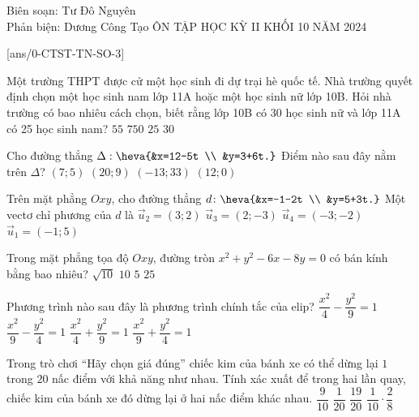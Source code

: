 
\setcounter{demsode}{3} %

\begin{name}
	{Biên soạn: Tư Đô Nguyên\\
		Phản biện: Dương Công Tạo}
	{ÔN TẬP HỌC KỲ II KHỐI 10 NĂM 2024}
\end{name}

\cautn
{}[ans/0-CTST-TN-SO-3]
\setcounter{ex}{0}

\begin{ex}%
	Một trường THPT được cử một học sinh đi dự trại hè quốc tế. Nhà trường quyết định chọn một học sinh nam lớp 11A hoặc một học sinh nữ lớp 10B. Hỏi nhà trường có bao nhiêu cách chọn, biết rằng lớp 10B có 30 học sinh nữ và lớp 11A có 25 học sinh nam?
	\choice
	{\True $55$}
	{$750$}
	{$25$}
	{$30$}
	\loigiai{}
\end{ex}
\begin{ex}%
	Cho đường thẳng $\Delta:\heva{&x=12-5t \\
		&y=3+6t.}$ Điểm nào sau đây nằm trên $\Delta$?
	\choice
	{$(7; 5)$}
	{$(20; 9)$}
	{\True $(-13; 33)$}
	{$(12; 0)$}
	\loigiai{}
\end{ex}
\begin{ex}%
	Trên mặt phẳng $Ox y$, cho đường thẳng $d\colon \heva{&x=-1-2t \\
		&y=5+3t.}$ Một vectơ chỉ phương của $d$ là
	\choice
	{$\vec{u}_2=(3; 2)$}
	{\True$\vec{u}_3=(2;-3)$}
	{$\vec{u}_4=(-3;-2)$}
	{$\vec{u}_1=(-1; 5)$}
	\loigiai{}
\end{ex}
\begin{ex}%
	Trong mặt phẳng tọa độ $Ox y$, đường tròn $x^2+y^2-6x-8y=0$ có bán kính bằng bao nhiêu?
	\choice
	{$\sqrt{10}$}
	{$10$}
	{\True$5$}
	{$25$}
	\loigiai{}
\end{ex}
\begin{ex}%
	Phương trình nào sau đây là phương trình chính tắc của elip?
	\choice
	{$\dfrac{x^2}{4}-\dfrac{y^2}{9}=1$}
	{$\dfrac{x^2}{9}-\dfrac{y^2}{4}=1$}
	{$\dfrac{x^2}{4}+\dfrac{y^2}{9}=1$}
	{\True$\dfrac{x^2}{9}+\dfrac{y^2}{4}=1$}
	\loigiai{}
\end{ex}
\begin{ex}%
	Trong trò chơi ``Hãy chọn giá đúng'' chiếc kim của bánh xe có thể dừng lại $1$ trong $20$ nấc điểm với khả năng như nhau. Tính xác xuất để trong hai lần quay, chiếc kim của bánh xe đó dừng lại ở hai nấc điểm khác nhau.
	\choice
	{$\dfrac{9}{10}$}
	{$\dfrac{1}{20}$}
	{\True$\dfrac{19}{20}$}
	{$\dfrac{1}{10} \cdot \dfrac{2}{8}$}
	\loigiai{}
\end{ex}
